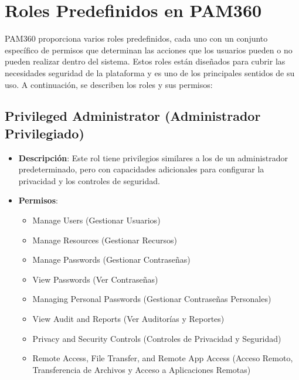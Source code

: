 
\section{Roles Predefinidos en PAM360}

PAM360 proporciona varios roles predefinidos, cada uno con un conjunto específico de permisos que determinan las acciones que los usuarios pueden o no pueden realizar dentro del sistema. Estos roles están diseñados para cubrir las necesidades seguridad de la plataforma y es uno de los principales sentidos de su uso. A continuación, se describen los roles y sus permisos:

\subsection{Privileged Administrator (Administrador Privilegiado)}
\begin{itemize}
	\item \textbf{Descripción}: Este rol tiene privilegios similares a los de un administrador predeterminado, pero con capacidades adicionales para configurar la privacidad y los controles de seguridad.
	\item \textbf{Permisos}:
	\begin{itemize}
		\item Manage Users (Gestionar Usuarios)
		\item Manage Resources (Gestionar Recursos)
		\item Manage Passwords (Gestionar Contraseñas)
		\item View Passwords (Ver Contraseñas)
		\item Managing Personal Passwords (Gestionar Contraseñas Personales)
		\item View Audit and Reports (Ver Auditorías y Reportes)
		\item Privacy and Security Controls (Controles de Privacidad y Seguridad)
		\item Remote Access, File Transfer, and Remote App Access (Acceso Remoto, Transferencia de Archivos y Acceso a Aplicaciones Remotas)
	\end{itemize}
\end{itemize}


